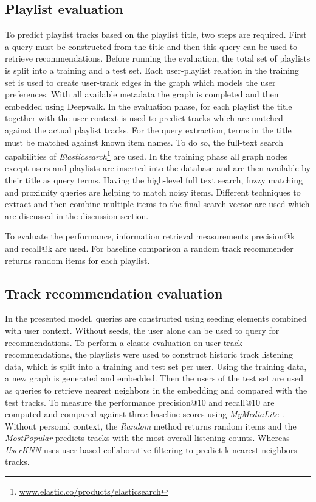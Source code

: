 \documentclass[sigconf]{acmart}
\begin{document}
\subsection{Playlist evaluation}
\label{subsec:playlist_eval}
To predict playlist tracks based on the playlist title, two steps are required. First a query must be constructed from the title and then this query can be used to retrieve recommendations. Before running the evaluation, the total set of playlists is split into a training and a test set. Each user-playlist relation in the training set is used to create user-track edges in the graph which models the user preferences. With all available metadata the graph is completed and then embedded using Deepwalk. In the evaluation phase, for each playlist the title together with the user context is used to predict tracks which are matched against the actual playlist tracks. For the query extraction, terms in the title must be matched against known item names. To do so, the full-text search capabilities of \emph{Elasticsearch}\footnote{\url{www.elastic.co/products/elasticsearch}} are used. In the training phase all graph nodes except users and playlists are inserted into the database and are then available by their title as query terms. Having the high-level full text search, fuzzy matching and proximity queries are helping to match noisy items. Different techniques to extract and then combine multiple items to the final search vector are used which are discussed in the discussion section.


To evaluate the performance, information retrieval measurements precision@k and recall@k are used. For baseline comparison a random track recommender returns random items for each playlist.



\subsection{Track recommendation evaluation}
\label{subsec:track_rec_eval}
In the presented model, queries are constructed using seeding elements combined with user context. Without seeds, the user alone can be used to query for recommendations. To perform a classic evaluation on user track recommendations, the playlists were used to construct historic track listening data, which is split into a training and test set per user. Using the training data, a new graph is generated and embedded. Then the users of the test set are used as queries to retrieve nearest neighbors in the embedding and compared with the test tracks. To measure the performance precision@10 and recall@10 are computed and compared against three baseline scores using \emph{MyMediaLite}~\cite{Gantner2011MyMediaLite}. Without personal context, the \emph{Random} method returns random items and the \emph{MostPopular} predicts tracks with the most overall listening counts. Whereas \emph{UserKNN} uses user-based collaborative filtering to predict k-nearest neighbors tracks. 
\end{document}
